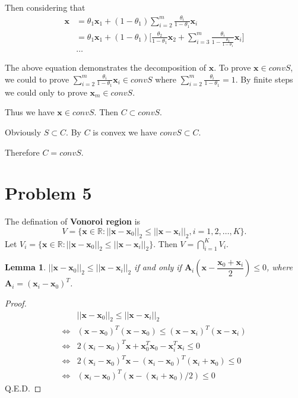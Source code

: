 \documentclass{article}
\def\RR{\mathbb{R}}
\def\bx{\boldsymbol{x}}
\def\bA{\boldsymbol{A}}
\def\vvert{\vert\vert}
\newtheorem{lemma}{Lemma}
\newtheorem{proof}{Proof}
\begin{document}
\begin{enumerate}[(a)]
		Then considering that
		$$
		\begin{aligned}
		\bx
		&=
		\theta_1\bx_1+(1-\theta_1)
		\sum_{i=2}^m\frac{\theta_i}{1-\theta_1}\bx_i
		\\
		&=
		\theta_1\bx_1+(1-\theta_1)
		\bigg[
			\frac{\theta_2}{1-\theta_1}\bx_2
			+
			\sum_{i=3}^m\frac{\theta_i}
			{1-\frac{\theta_2}{1-\theta_1}}\bx_i
		\bigg]
		\\
		&
		\dots
		\end{aligned}
		$$

		The above equation demonstrates the decomposition of $\bx$. To prove $\bx\in conv S$, we could to prove $\sum_{i=2}^m\frac{\theta_i}{1-\theta_1}\bx_i\in conv S$ where $\sum_{i=2}^m\frac{\theta_i}{1-\theta_1}=1$. By finite steps we could only to prove $\bx_m\in conv S$.

		Thus we have $\bx\in conv S$. Then $C\subset conv S$.

		Obviously $S\subset C$. By $C$ is convex we have $conv S\subset C$.

		Therefore $C= conv S$.
\end{enumerate}

\newpage
\section*{Problem 5}

The defination of \textbf{Vonoroi region} is 
$$
V=
\{
	\bx\in\RR:
	\vvert\bx-\bx_0\vvert_2\le\vvert\bx-\bx_i\vvert_2,
	i=1,2,\dots,K
\}.
$$
Let 
$
V_i=
\{
	\bx\in\RR:
	\vvert\bx-\bx_0\vvert_2\le\vvert\bx-\bx_i\vvert_2
\}
$. Then $V=\bigcap_{i=1}^KV_i$.

\begin{lemma}
	$\vvert\bx-\bx_0\vvert_2\le\vvert\bx-\bx_i\vvert_2$
	if and only if 
	$\bA_i(\bx-\dfrac{\bx_0+\bx_i}{2})\le0$, 
	where $\bA_i=(\bx_i-\bx_0)^T$.
\end{lemma}

\begin{proof}
	$$
	\begin{aligned}
		&
		\vvert\bx-\bx_0\vvert_2\le\vvert\bx-\bx_i\vvert_2
		\\
		\iff
		&
		(\bx-\bx_0)^T(\bx-\bx_0)\le(\bx-\bx_i)^T(\bx-\bx_i)
		\\
		\iff
		&
		2(\bx_i-\bx_0)^T\bx+\bx_0^T\bx_0-\bx_i^T\bx_i \le 0
		\\
		\iff
		&
		2(\bx_i-\bx_0)^T\bx-(\bx_i-\bx_0)^T(\bx_i+\bx_0)\le0
		\\
		\iff
		&
		(\bx_i-\bx_0)^T(\bx-(\bx_i+\bx_0)/2)\le0
	\end{aligned}
	$$
	Q.E.D.
\end{proof}
\end{document}
